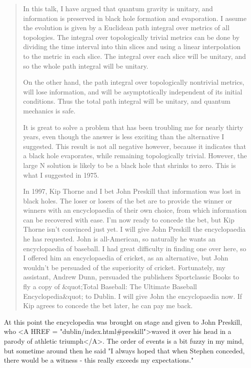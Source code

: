 \begin{quote}
     In this talk, I have argued that quantum gravity is unitary, and
     information is preserved in black hole formation and evaporation. 
     I assume the evolution is given by a Euclidean path integral over
     metrics of all topologies. The integral over topologically trivial
     metrics can be done by dividing the time interval into thin slices
     and using a linear interpolation to the metric in each slice.  The
     integral over each slice will be unitary, and so the whole path
     integral will be unitary.

     On the other hand, the path integral over topologically nontrivial
     metrics, will lose information, and will be asymptotically independent
     of its initial conditions. Thus the total path integral will be
     unitary, and quantum mechanics is safe.

     It is great to solve a problem that has been troubling me for nearly
     thirty years, even though the answer is less exciting than the
     alternative I suggested.  This result is not all negative however,
     because it indicates that a black hole evaporates, while remaining
     topologically trivial.  However, the large N solution is likely to 
     be a black hole that shrinks to zero.  This is what I suggested in 1975.

     In 1997, Kip Thorne and I bet John Preskill that information was
     lost in black holes.  The loser or losers of the bet are to provide
     the winner or winners with an encyclopaedia of their own choice, from
     which information can be recovered with ease.  I'm now ready to concede
     the bet, but Kip Thorne isn't convinced just yet.  I will give John
     Preskill the encyclopaedia he has requested.  John is all-American, so
     naturally he wants an encyclopaedia of baseball.  I had great difficulty 
     in finding one over here, so I offered him an encyclopaedia of cricket, 
     as an alternative, but John wouldn't be persuaded of the superiority 
     of cricket.  Fortunately, my assistant, Andrew Dunn, persuaded the 
     publishers Sportclassic Books to fly a copy of &quot;Total Baseball: The 
     Ultimate Baseball Encyclopedia&quot; to Dublin.  I will give John the 
     encyclopaedia now.  If Kip agrees to concede the bet later, he
     can pay me back.

\end{quote}
    
At this point the encyclopedia was brought on stage and given
to John Preskill, who <A HREF = "dublin/index.html#preskill">waved it over his 
head in a parody of athletic triumph</A>.  The order of events is 
a bit fuzzy in my
mind, but sometime around then he said "I always hoped that when 
Stephen conceded, there would be a witness - this really exceeds 
my expectations."


